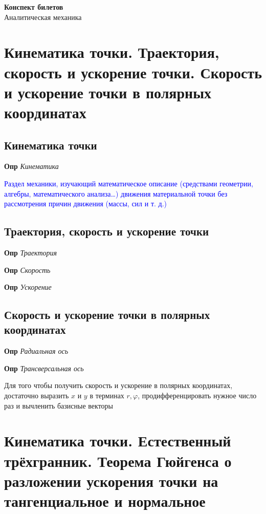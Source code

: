\documentclass[a4paper, 14pt]{article}
\begin{document}
{\huge
    \begin{center}
    {\textbf{Конспект билетов}}
        \\
        Аналитическая механика
    \end{center}
}
    \tableofcontents \newpage
    
    \section{Кинематика точки. Траектория, скорость и ускорение точки.
    Скорость и ускорение точки в полярных координатах}
    
    \subsection{Кинематика точки}
    
    \textbf{Опр} \textit{Кинематика}
    
    \textcolor{blue}{Раздел механики, изучающий математическое описание (средствами геометрии, алгебры,
        математического анализа…) движения материальной точки без рассмотрения причин движения (массы, сил и т. д.)}
    
    \subsection{Траектория, скорость и ускорение точки}
    
    \textbf{Опр} \textit{Траектория}
    
    \textbf{Опр} \textit{Скорость}
    
    \textbf{Опр} \textit{Ускорение}
    
    \subsection{Скорость и ускорение точки в полярных координатах}
    
    \textbf{Опр} \textit{Радиальная ось}
    
    \textbf{Опр} \textit{Трансверсальная ось}
    
    Для того чтобы получить скорость и ускорение в полярных координатах, достаточно выразить $x$ и $y$ в терминах $r,
    \varphi$, продифференцировать нужное число раз и вычленить базисные векторы
    
    \section{Кинематика точки. Естественный трёхгранник.
    Теорема Гюйгенса о разложении ускорения точки на тангенциальное и нормальное}
    
\end{document}
